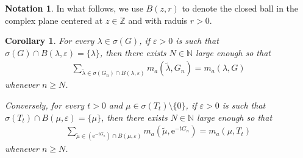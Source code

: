 \documentclass{amsart}
\numberwithin{equation}{section}
\newtheorem{corollary}[theorem]{Corollary}
\theoremstyle{definition}
\newtheorem{notation}[theorem]{Notation}
\newcommand\eps{\varepsilon}
\newcommand\la{\lambda}
\newcommand\si{\sigma}
\newcommand\mbb{\mathbb}
\newcommand\mr{\mathrm}
\begin{document}
%

\begin{notation}
In what follows, we use $B(z,r)$ to denote the closed ball in the complex plane centered at $z\in\mbb Z$
and with raduis $r>0$.
\end{notation}

%

\begin{corollary}
For every $\la\in\si(G)$, if $\eps>0$ is such that $\si(G)\cap B(\la,\eps)=\{\la\}$,
then there exists $N\in\mbb N$ large enough so that
\begin{align}
\label{Equation: Multiplicities Convergence 1}
\sum_{\tilde\la\in\si(G_n)\cap B(\la,\eps)}m_a(\tilde\la,G_n)=m_a(\la,G)
\end{align}
whenever $n\geq N$.

Conversely, for every $t>0$ and $\mu\in\si(T_t)\setminus\{0\}$, if $\eps>0$ is such that $\si(T_t)\cap B(\mu,\eps)=\{\mu\}$,
then there exists $N\in\mbb N$ large enough so that
\begin{align}
\label{Equation: Multiplicities Convergence 2}
\sum_{\tilde\mu\in(\mr e^{-t G_n})\cap B(\mu,\eps)}m_a(\tilde\mu,\mr e^{-t G_n})=m_a(\mu,T_t)
\end{align}
whenever $n\geq N$.
\end{corollary}


%
\end{document}
